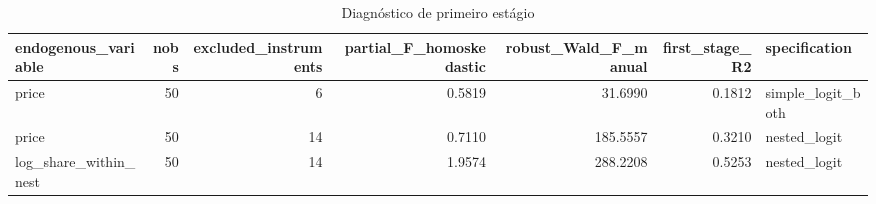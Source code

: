 \begin{table}[!htbp]
\centering
\caption{Diagnóstico de primeiro estágio}
\label{tab:first-stage}
\small
\begin{tabular}{lrrrrrl}
\toprule
endogenous_variable & nobs & excluded_instruments & partial_F_homoskedastic & robust_Wald_F_manual & first_stage_R2 & specification \\
\midrule
price & 50 & 6 & 0.5819 & 31.6990 & 0.1812 & simple\_logit\_both \\
price & 50 & 14 & 0.7110 & 185.5557 & 0.3210 & nested\_logit \\
log\_share\_within\_nest & 50 & 14 & 1.9574 & 288.2208 & 0.5253 & nested\_logit \\
\bottomrule
\end{tabular}

\end{table}
